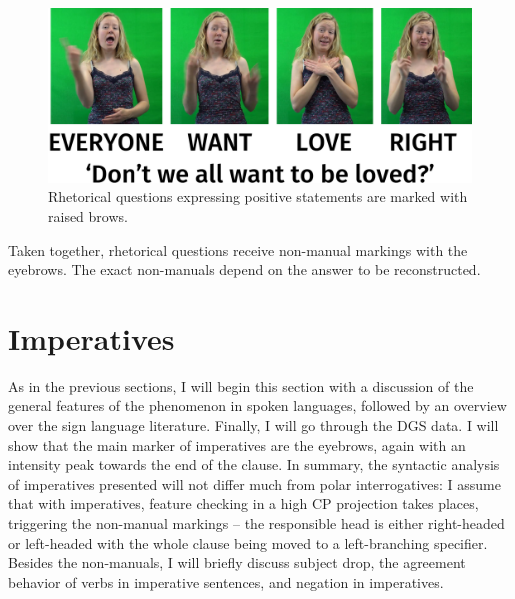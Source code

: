 \begin{figure}[bt]
\centering
	\includegraphics[width=1.0\textwidth]{rhetlove.jpg}
	\caption{Rhetorical questions expressing positive statements are marked with raised brows.}
	\label{rhetlove}
\end{figure}

Taken together, rhetorical questions receive non-manual markings with the eyebrows. The exact non-manuals depend on the answer to be reconstructed. 


\section{Imperatives}\label{generalsectionimperatives}
As in the previous sections, I will begin this section with a discussion of the general features of the phenomenon in spoken languages, followed by an overview over the sign language literature. Finally, I will go through the DGS data. I will show that the main marker of imperatives are the eyebrows, again with an intensity peak towards the end of the clause. In summary, the syntactic analysis of imperatives presented will not differ much from polar interrogatives: I assume that with imperatives, feature checking in a high CP projection takes places, triggering the non-manual markings -- the responsible head is either right-headed or left-headed with the whole clause being moved to a left-branching specifier. Besides the non-manuals, I will briefly discuss subject drop, the agreement behavior of verbs in imperative sentences, and negation in imperatives. 


